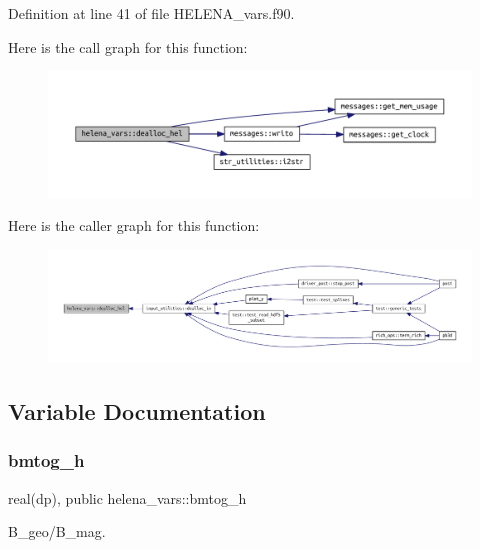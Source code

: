 Definition at line 41 of file H\+E\+L\+E\+N\+A\+\_\+vars.\+f90.

Here is the call graph for this function\+:\nopagebreak
\begin{figure}[H]
\begin{center}
\leavevmode
\includegraphics[width=350pt]{namespacehelena__vars_add7b3eea7306eca7fb45737ff915523f_cgraph}
\end{center}
\end{figure}
Here is the caller graph for this function\+:\nopagebreak
\begin{figure}[H]
\begin{center}
\leavevmode
\includegraphics[width=350pt]{namespacehelena__vars_add7b3eea7306eca7fb45737ff915523f_icgraph}
\end{center}
\end{figure}


\subsection{Variable Documentation}
\mbox{\label{namespacehelena__vars_aab2e408c4a8677843633d486dc216dfe}} 
\subsubsection{\texorpdfstring{bmtog\+\_\+h}{bmtog\_h}}
{\footnotesize\ttfamily real(dp), public helena\+\_\+vars\+::bmtog\+\_\+h}



B\+\_\+geo/\+B\+\_\+mag. 



